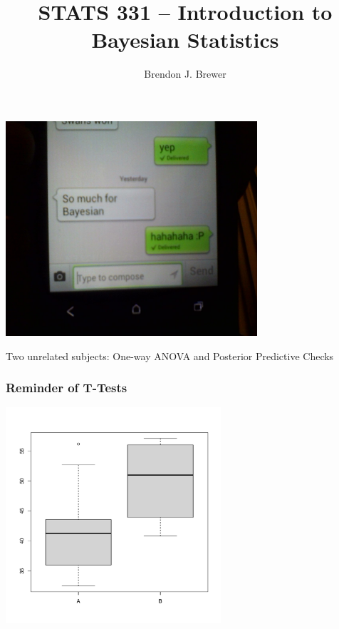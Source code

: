\documentclass{beamer}
\author{Brendon J. Brewer}
\title{STATS 331 -- Introduction to Bayesian Statistics}
\institute{The University of Auckland}
\date{}
\begin{document}
\frame{\titlepage}

\begin{frame}
\begin{center}
\includegraphics[width=0.7\textwidth]{images/dad.png}
\end{center}

\end{frame}


\begin{frame}
\centering
\Large
Two unrelated subjects:
One-way ANOVA and Posterior Predictive Checks

\end{frame}


\begin{frame}
\frametitle{Reminder of T-Tests}

\begin{center}
\includegraphics[width=0.6\textwidth]{images/widgets_boxplot.pdf}
\end{center}

\end{frame}
\end{document}
